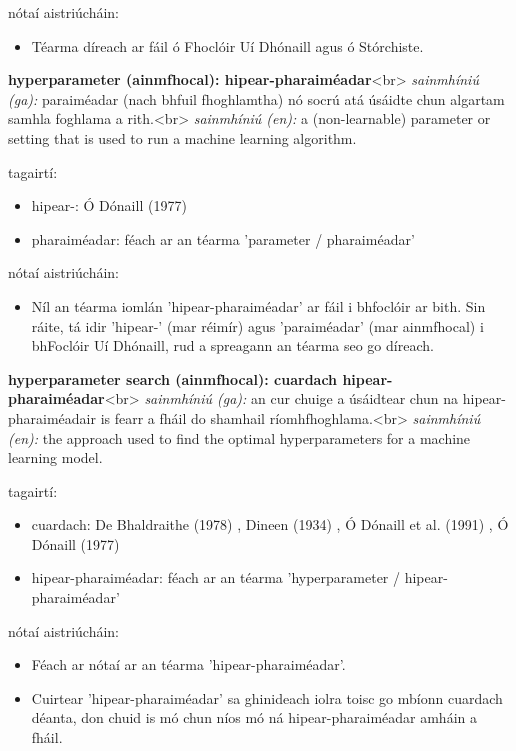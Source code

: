 \documentclass{article}
\begin{document}
nótaí aistriúcháin:
\begin{itemize}
	\item Téarma díreach ar fáil ó Fhoclóir Uí Dhónaill agus ó Stórchiste.
\end{itemize}


\textbf{hyperparameter (ainmfhocal): hipear-pharaiméadar}<br>
\textit{sainmhíniú (ga):} paraiméadar (nach bhfuil fhoghlamtha) nó socrú atá úsáidte chun algartam samhla foghlama a rith.<br>
\textit{sainmhíniú (en):} a (non-learnable) parameter or setting that is used to run a machine learning algorithm.

tagairtí:
\begin{itemize}
	\item hipear-: Ó Dónaill (1977) \cite{odonaill}
	\item pharaiméadar: féach ar an téarma 'parameter / pharaiméadar'
\end{itemize}

nótaí aistriúcháin:
\begin{itemize}
	\item Níl an téarma iomlán 'hipear-pharaiméadar' ar fáil i bhfoclóir ar bith. Sin ráite, tá idir 'hipear-' (mar réimír) agus 'paraiméadar' (mar ainmfhocal) i bhFoclóir Uí Dhónaill, rud a spreagann an téarma seo go díreach.
\end{itemize}


\textbf{hyperparameter search (ainmfhocal): cuardach hipear-pharaiméadar}<br>
\textit{sainmhíniú (ga):} an cur chuige a úsáidtear chun na hipear-pharaiméadair is fearr a fháil do shamhail ríomhfhoghlama.<br>
\textit{sainmhíniú (en):} the approach used to find the optimal hyperparameters for a machine learning model.

tagairtí:
\begin{itemize}
	\item cuardach: De Bhaldraithe (1978) \cite{de-bhaldraithe}, Dineen (1934) \cite{dineen}, Ó Dónaill et al. (1991) \cite{focloir-beag}, Ó Dónaill (1977) \cite{odonaill}
	\item hipear-pharaiméadar: féach ar an téarma 'hyperparameter / hipear-pharaiméadar'
\end{itemize}

nótaí aistriúcháin:
\begin{itemize}
	\item Féach ar nótaí ar an téarma 'hipear-pharaiméadar'.
	\item Cuirtear 'hipear-pharaiméadar' sa ghinideach iolra toisc go mbíonn cuardach déanta, don chuid is mó chun níos mó ná hipear-pharaiméadar amháin a fháil.
\end{itemize}
\end{document}
